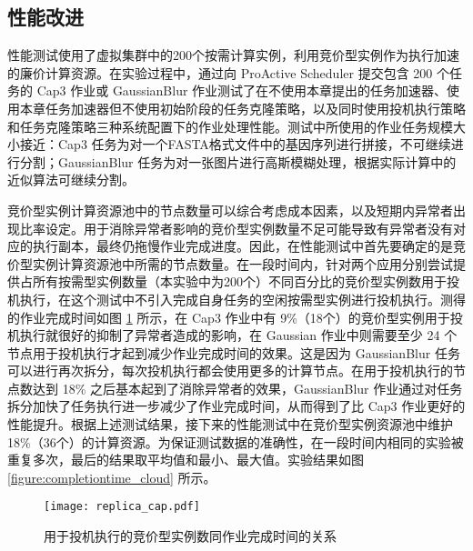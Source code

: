 \subsection{性能改进}
\label{sec:no2_perf}
性能测试使用了虚拟集群中的200个按需计算实例，利用竞价型实例作为执行加速的廉价计算资源。在实验过程中，通过向 ProActive Scheduler 提交包含 200 个任务的 Cap3 作业或 GaussianBlur 作业测试了在不使用本章提出的任务加速器、使用本章任务加速器但不使用初始阶段的任务克隆策略，以及同时使用投机执行策略和任务克隆策略三种系统配置下的作业处理性能。测试中所使用的作业任务规模大小接近：Cap3 任务为对一个FASTA格式文件中的基因序列进行拼接，不可继续进行分割；GaussianBlur 任务为对一张图片进行高斯模糊处理，根据实际计算中的近似算法可继续分割。

竞价型实例计算资源池中的节点数量可以综合考虑成本因素，以及短期内异常者出现比率设定。用于消除异常者影响的竞价型实例数量不足可能导致有异常者没有对应的执行副本，最终仍拖慢作业完成进度。因此，在性能测试中首先要确定的是竞价型实例计算资源池中所需的节点数量。在一段时间内，针对两个应用分别尝试提供占所有按需型实例数量（本实验中为200个）不同百分比的竞价型实例数用于投机执行，在这个测试中不引入完成自身任务的空闲按需型实例进行投机执行。测得的作业完成时间如图 \ref{figure:replica_cap} 所示，在 Cap3 作业中有 9\%（18个）的竞价型实例用于投机执行就很好的抑制了异常者造成的影响，在 Gaussian 作业中则需要至少 24 个节点用于投机执行才起到减少作业完成时间的效果。这是因为 GaussianBlur 任务可以进行再次拆分，每次投机执行都会使用更多的计算节点。在用于投机执行的节点数达到 18\% 之后基本起到了消除异常者的效果，GaussianBlur 作业通过对任务拆分加快了任务执行进一步减少了作业完成时间，从而得到了比 Cap3 作业更好的性能提升。根据上述测试结果，接下来的性能测试中在竞价型实例资源池中维护 18\%（36个）的计算资源。为保证测试数据的准确性，在一段时间内相同的实验被重复多次，最后的结果取平均值和最小、最大值。实验结果如图 \ref{figure:completiontime_cloud} 所示。
\begin{figure}
  \centering
  \texttt{[image: replica\_cap.pdf]}
  \caption{用于投机执行的竞价型实例数同作业完成时间的关系}
  \label{figure:replica_cap}
\end{figure}

